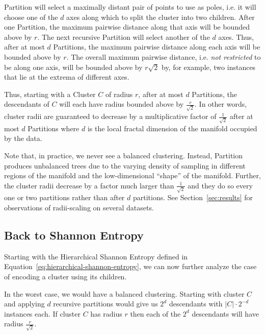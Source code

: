Partition will select a maximally distant pair of points to use as poles, i.e. it will choose one of the $d$ axes along which to split the cluster into two children.
After one Partition, the maximum pairwise distance along that axis will be bounded above by $r$.
The next recursive Partition will select another of the $d$ axes.
Thus, after at most $d$ Partitions, the maximum pairwise distance along each axis will be bounded above by $r$.
The overall maximum pairwise distance, i.e. \textit{not restricted} to be along one axis, will be bounded above by $r \sqrt{2}$ by, for example, two instances that lie at the extrema of different axes.

Thus, starting with a Cluster $C$ of radius $r$, after at most $d$ Partitions, the descendants of $C$ will each have radius bounded above by $\frac{r}{\sqrt{2}}$.
In other words, cluster radii are guaranteed to decrease by a multiplicative factor of $\frac{1}{\sqrt{2}}$ after at most $d$ Partitions where $d$ is the local fractal dimension of the manifold occupied by the data.

Note that, in practice, we never see a balanced clustering.
Instead, Partition produces unbalanced trees due to the varying density of sampling in different regions of the manifold and the low-dimensional ``shape'' of the manifold.
Further, the cluster radii decrease by a factor much larger than $\frac{1}{\sqrt{2}}$ and they do so every one or two partitions rather than after $d$ partitions.
See Section~\ref{sec:results} for observations of radii-scaling on several datasets.


\subsection{Back to Shannon Entropy}
\label{subsec:methods:back-to-shannon-entropy}

Starting with the Hierarchical Shannon Entropy defined in Equation~\ref{eq:hierarchical-shannon-entropy}, we can now further analyze the case of encoding a cluster using its children.

In the worst case, we would have a balanced clustering.
Starting with cluster $C$ and applying $d$ recursive partitions would give us $2^d$ descendants with $|C| \cdot 2^{-d}$ instances each.
If cluster $C$ has radius $r$ then each of the $2^d$ descendants will have radius $\frac{r}{\sqrt{2}}$.

